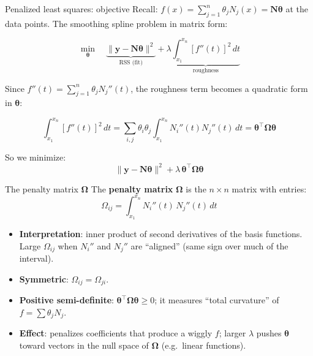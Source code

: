 \documentclass[aspectratio=169]{beamer}
\begin{document}
\begin{frame}{Penalized least squares: objective}
Recall: $f(x) = \sum_{j=1}^n \theta_j N_j(x) = \mathbf{N}\boldsymbol{\theta}$ at the data points. The smoothing spline problem in matrix form:

\[
\min_{\boldsymbol{\theta}} \quad \underbrace{\|\mathbf{y} - \mathbf{N}\boldsymbol{\theta}\|^2}_{\text{RSS (fit)}} + \lambda \underbrace{\int_{x_1}^{x_n} [f''(t)]^2 \, dt}_{\text{roughness}}
\]

Since $f''(t) = \sum_{j=1}^n \theta_j N_j''(t)$, the roughness term becomes a quadratic form in $\boldsymbol{\theta}$:

\[
\int_{x_1}^{x_n} [f''(t)]^2 \, dt = \sum_{i,j} \theta_i \theta_j \int_{x_1}^{x_n} N_i''(t) N_j''(t) \, dt = \boldsymbol{\theta}^\top \boldsymbol{\Omega} \boldsymbol{\theta}
\]

So we minimize:
\[
\|\mathbf{y} - \mathbf{N}\boldsymbol{\theta}\|^2 + \lambda \, \boldsymbol{\theta}^\top \boldsymbol{\Omega} \boldsymbol{\theta}
\]
\end{frame}

\begin{frame}{The penalty matrix $\boldsymbol{\Omega}$}
The \textbf{penalty matrix} $\boldsymbol{\Omega}$ is the $n \times n$ matrix with entries:
\[
\Omega_{ij} = \int_{x_1}^{x_n} N_i''(t) \, N_j''(t) \, dt
\]

\begin{itemize}
    \item \textbf{Interpretation}: inner product of second derivatives of the basis functions. Large $\Omega_{ij}$ when $N_i''$ and $N_j''$ are “aligned” (same sign over much of the interval).
    \item \textbf{Symmetric}: $\Omega_{ij} = \Omega_{ji}$.
    \item \textbf{Positive semi-definite}: $\boldsymbol{\theta}^\top \boldsymbol{\Omega} \boldsymbol{\theta} \geq 0$; it measures “total curvature” of $f = \sum \theta_j N_j$.
    \item \textbf{Effect}: penalizes coefficients that produce a wiggly $f$; larger $\lambda$ pushes $\boldsymbol{\theta}$ toward vectors in the null space of $\boldsymbol{\Omega}$ (e.g.\ linear functions).
\end{itemize}
\end{frame}
\end{document}
